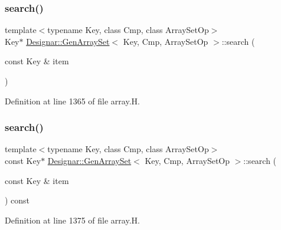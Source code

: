\subsubsection{\texorpdfstring{search()}{search()}\hspace{0.1cm}{\footnotesize\ttfamily [1/2]}}
{\footnotesize\ttfamily template$<$typename Key, class Cmp, class Array\+Set\+Op$>$ \\
Key$\ast$ \hyperlink{class_designar_1_1_gen_array_set}{Designar\+::\+Gen\+Array\+Set}$<$ Key, Cmp, Array\+Set\+Op $>$\+::search (\begin{DoxyParamCaption}\item[{const Key \&}]{item }\end{DoxyParamCaption})\hspace{0.3cm}{\ttfamily [inline]}}



Definition at line 1365 of file array.\+H.

\mbox{\label{class_designar_1_1_gen_array_set_adbe26651c80bbcc92afe2563f6bcefc3}} 
\subsubsection{\texorpdfstring{search()}{search()}\hspace{0.1cm}{\footnotesize\ttfamily [2/2]}}
{\footnotesize\ttfamily template$<$typename Key, class Cmp, class Array\+Set\+Op$>$ \\
const Key$\ast$ \hyperlink{class_designar_1_1_gen_array_set}{Designar\+::\+Gen\+Array\+Set}$<$ Key, Cmp, Array\+Set\+Op $>$\+::search (\begin{DoxyParamCaption}\item[{const Key \&}]{item }\end{DoxyParamCaption}) const\hspace{0.3cm}{\ttfamily [inline]}}



Definition at line 1375 of file array.\+H.

\mbox{\label{class_designar_1_1_gen_array_set_ab5b56f597b39e2dbf03514a2eb096e8a}} 

